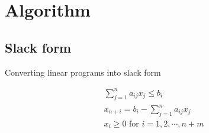 \section{Algorithm}

\subsection{Slack form}

\begin{frame}{Converting linear programs into slack form}

    \begin{gather*}
        \sum_{j=1}^{n}a_{ij}x_j \le b_i\\
        x_{n+i} = b_{i} - \sum_{j=1}^{n}a_{ij}x_j\\
        x_i\ge 0 \text{ for } i = 1,2,\cdots,n+m
    \end{gather*}

\end{frame}